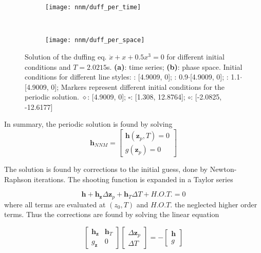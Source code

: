 \begin{figure}[!ht]
  \centering
  \begin{subfigure}[b]{0.45\textwidth}
    \texttt{[image: nnm/duff\_per\_time]}
  \end{subfigure}
  ~
  \begin{subfigure}[b]{0.45\textwidth}
    \texttt{[image: nnm/duff\_per\_space]}
  \end{subfigure}
  \caption{Solution of the duffing eq. $\ddot x + x + 0.5x^3=0$ for different
    initial conditions and $T=2.0215$s.
    \textbf{(a)}: time series;
    \textbf{(b)}: phase space.
    Initial conditions for different line styles:
    \sampleline{}: [4.9009, 0];
    : 0.9$\cdot$[4.9009, 0];
    : 1.1$\cdot$[4.9009, 0];
    Markers represent different initial conditions for the periodic solution.
    $\diamond$: [4.9009, 0];
    $\square$: [1.308, 12.8764];
    $\circ$: [-2.0825, -12.6177]
  }
  \label{fig:sm_phase}
\end{figure}


In summary, the periodic solution is found by solving
\begin{equation}
  \label{eq:sm_bvp_problem}
  \bm h_{NNM} =
  \begin{bmatrix}
    \bm h(\bm z_{p}, T) = 0 \\
    g(\bm z_{p} ) = 0
  \end{bmatrix}
\end{equation}

The solution is found by corrections to the initial guess, done by
Newton-Raphson iterations. The shooting function is expanded in a Taylor series

\begin{equation}
  \label{eq:sm_nr}
  \bm h +
  \bm h_{\bm z} \Delta \bm z_{p} +
  \bm h_{T} \Delta T
  + H.O.T. = 0
\end{equation}
where all terms are evaluated at $(z_0,T)$ and $H.O.T.$ the neglected higher
order terms. Thus the corrections are found by solving the linear equation

\begin{equation}
  \label{eq:sm_nr_sol}
  \begin{bmatrix}
    \bm h_{\bm z} & \bm h_{T} \\
    g_{\bm z} & 0
  \end{bmatrix}
  \begin{bmatrix}
    \Delta \bm z_{p} \\
    \Delta T
  \end{bmatrix}
  = -
  \begin{bmatrix}
    \bm h \\
    g
  \end{bmatrix}
\end{equation}

